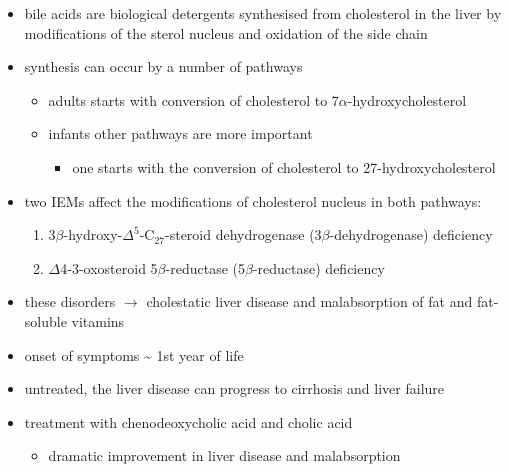 \documentclass{scrartcl}
\begin{document}
\begin{itemize}
\begin{enumerate}
\begin{enumerate}
\begin{itemize}
\item bile acids are biological detergents synthesised from cholesterol
in the liver by modifications of the sterol nucleus and oxidation of
the side chain
\item synthesis can occur by a number of pathways
\begin{itemize}
\item adults starts with conversion of cholesterol to 7\(\alpha\)-hydroxycholesterol
\item infants other pathways are more important
\begin{itemize}
\item one starts with the conversion of cholesterol to 27-hydroxycholesterol
\end{itemize}
\end{itemize}
\item two IEMs affect the modifications of cholesterol nucleus in both pathways:
\begin{enumerate}
\item 3\(\beta\)-hydroxy-\(\Delta^{\text{5}}\)-C\(_{\text{27}}\)-steroid dehydrogenase (3\(\beta\)-dehydrogenase) deficiency
\item \(\Delta\)4-3-oxosteroid 5\(\beta\)-reductase (5\(\beta\)-reductase) deficiency
\end{enumerate}
\item these disorders \(\to\) cholestatic liver disease and malabsorption of
fat and fat-soluble vitamins
\item onset of symptoms \textasciitilde{} 1st year of life
\item untreated, the liver disease can progress to cirrhosis and liver failure
\item treatment with chenodeoxycholic acid and cholic acid
\begin{itemize}
\item dramatic improvement in liver disease and malabsorption
\end{itemize}


\end{itemize}
\end{enumerate}
\end{enumerate}
\end{itemize}
\end{document}
